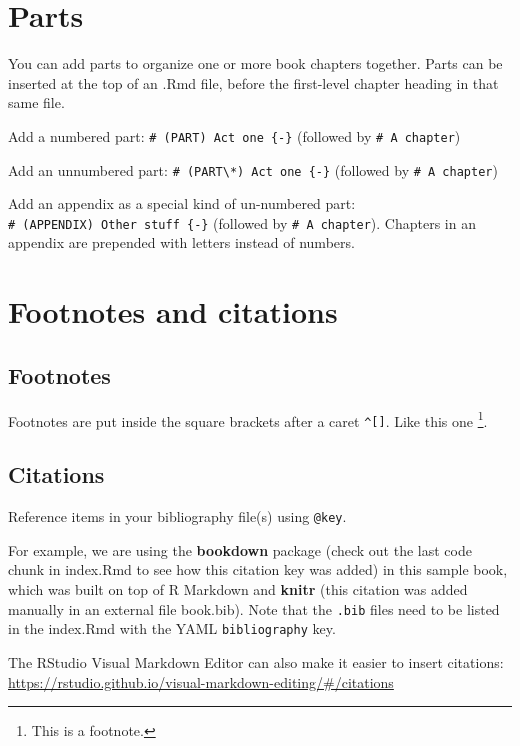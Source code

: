 \documentclass[
]{book}
\theoremstyle{definition}
\theoremstyle{definition}
\theoremstyle{definition}
\theoremstyle{definition}
\theoremstyle{remark}
\begin{document}
\hypertarget{parts}{%
\chapter{Parts}\label{parts}}

You can add parts to organize one or more book chapters together. Parts can be inserted at the top of an .Rmd file, before the first-level chapter heading in that same file.

Add a numbered part: \texttt{\#\ (PART)\ Act\ one\ \{-\}} (followed by \texttt{\#\ A\ chapter})

Add an unnumbered part: \texttt{\#\ (PART\textbackslash{}*)\ Act\ one\ \{-\}} (followed by \texttt{\#\ A\ chapter})

Add an appendix as a special kind of un-numbered part: \texttt{\#\ (APPENDIX)\ Other\ stuff\ \{-\}} (followed by \texttt{\#\ A\ chapter}). Chapters in an appendix are prepended with letters instead of numbers.

\hypertarget{footnotes-and-citations}{%
\chapter{Footnotes and citations}\label{footnotes-and-citations}}

\hypertarget{footnotes}{%
\section{Footnotes}\label{footnotes}}

Footnotes are put inside the square brackets after a caret \texttt{\^{}{[}{]}}. Like this one \footnote{This is a footnote.}.

\hypertarget{citations}{%
\section{Citations}\label{citations}}

Reference items in your bibliography file(s) using \texttt{@key}.

For example, we are using the \textbf{bookdown} package \citep{R-bookdown} (check out the last code chunk in index.Rmd to see how this citation key was added) in this sample book, which was built on top of R Markdown and \textbf{knitr} (this citation was added manually in an external file book.bib).
Note that the \texttt{.bib} files need to be listed in the index.Rmd with the YAML \texttt{bibliography} key.

The RStudio Visual Markdown Editor can also make it easier to insert citations: \url{https://rstudio.github.io/visual-markdown-editing/\#/citations}
\end{document}
